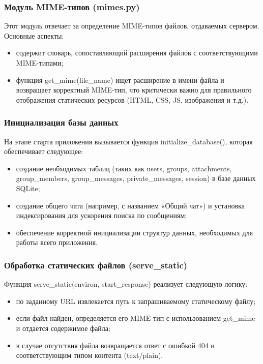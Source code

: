 \subsubsection{Модуль MIME-типов (mimes.py)}
Этот модуль отвечает за определение MIME-типов файлов, отдаваемых сервером. Основные аспекты:
\begin{itemize}
	\item содержит словарь, сопоставляющий расширения файлов с соответствующими MIME-типами;
	\item функция get\_mime(file\_name) ищет расширение в имени файла и возвращает корректный MIME-тип, что критически важно для правильного отображения статических ресурсов (HTML, CSS, JS, изображения и т.д.).
\end{itemize}

\subsubsection{Инициализация базы данных}
На этапе старта приложения вызывается функция initialize\_database(), которая обеспечивает следующее:
\begin{itemize}
	\item создание необходимых таблиц (таких как users, groups, attachments, group\_members, group\_messages, private\_messages, session) в базе данных SQLite;
	\item создание общего чата (например, с названием «Общий чат») и установка индексирования для ускорения поиска по сообщениям;
	\item обеспечение корректной инициализации структур данных, необходимых для работы всего приложения.
\end{itemize}

\subsubsection{Обработка статических файлов (serve\_static)}
Функция serve\_static(environ, start\_response) реализует следующую логику:
\begin{itemize}
	\item по заданному URL извлекается путь к запрашиваемому статическому файлу;
	\item если файл найден, определяется его MIME-тип с использованием get\_mime и отдается содержимое файла;
	\item в случае отсутствия файла возвращается ответ с ошибкой 404 и соответствующим типом контента (text/plain).
\end{itemize}

